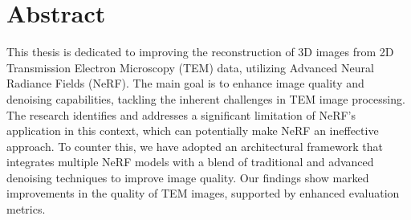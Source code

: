 \chapter{Abstract}\label{ch:Abstract}

This thesis is dedicated to improving the reconstruction of 3D images from 2D Transmission Electron Microscopy (TEM) data, utilizing Advanced Neural Radiance Fields (NeRF). The main goal is to enhance image quality and denoising capabilities, tackling the inherent challenges in TEM image processing. The research identifies and addresses a significant limitation of NeRF's application in this context, which can potentially make NeRF an ineffective approach. To counter this, we have adopted an architectural framework that integrates multiple NeRF models with a blend of traditional and advanced denoising techniques to improve image quality. Our findings show marked improvements in the quality of TEM images, supported by enhanced evaluation metrics. 

